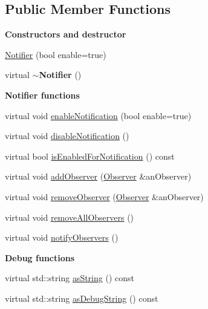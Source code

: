 \subsection*{Public Member Functions}
\begin{Indent}{\bf Constructors and destructor}\par
\begin{DoxyCompactItemize}
\item 
\hyperlink{class_base_1_1_notifier_ade4bd558bcb722ae11f2dc9b9e0af0a3}{Notifier} (bool enable=true)
\item 
virtual {\bfseries $\sim$\+Notifier} ()\hypertarget{class_base_1_1_notifier_ada72bc1d08008fedeaab951a820717ab}{}\label{class_base_1_1_notifier_ada72bc1d08008fedeaab951a820717ab}

\end{DoxyCompactItemize}
\end{Indent}
\begin{Indent}{\bf Notifier functions}\par
\begin{DoxyCompactItemize}
\item 
virtual void \hyperlink{class_base_1_1_notifier_abed77da5cd65a9a37a3b066aaa02e21d}{enable\+Notification} (bool enable=true)
\item 
virtual void \hyperlink{class_base_1_1_notifier_a050d0bbcf113f31cc16cd3b5229c7576}{disable\+Notification} ()
\item 
virtual bool \hyperlink{class_base_1_1_notifier_a2dfb91da06e2150d8b263b804ff93cac}{is\+Enabled\+For\+Notification} () const 
\item 
virtual void \hyperlink{class_base_1_1_notifier_a5c4e89f48f9688c71ffec225717dd79e}{add\+Observer} (\hyperlink{class_base_1_1_observer}{Observer} \&an\+Observer)
\item 
virtual void \hyperlink{class_base_1_1_notifier_abd13a6f822088d759f4464dbe2e6bb88}{remove\+Observer} (\hyperlink{class_base_1_1_observer}{Observer} \&an\+Observer)
\item 
virtual void \hyperlink{class_base_1_1_notifier_a54d234bcf2531b2a96333f8d3876d485}{remove\+All\+Observers} ()
\item 
virtual void \hyperlink{class_base_1_1_notifier_a9a3df81524d8db68dd64f9a26575c6b4}{notify\+Observers} ()
\end{DoxyCompactItemize}
\end{Indent}
\begin{Indent}{\bf Debug functions}\par
\begin{DoxyCompactItemize}
\item 
virtual std\+::string \hyperlink{class_base_1_1_notifier_a5b3d9077ee7023746a05377f2c6b192e}{as\+String} () const 
\item 
virtual std\+::string \hyperlink{class_base_1_1_notifier_ae9189ab41334252a50dbaa82b6326c12}{as\+Debug\+String} () const 
\end{DoxyCompactItemize}
\end{Indent}


